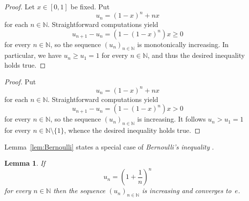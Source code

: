\documentclass[12pt]{article}
\newcommand{\bN}{\mathbb{N}} %
\newtheorem{lemma}{Lemma}
\begin{document}
\begin{proof}
  Let $x \in [0, 1]$ be fixed.
  Put
  $$
  u _n =  \left( 1 - x \right)^n + n x  
  $$
  for each $n \in \bN$.
  Straightforward computations yield
  $$
  u_{n + 1} - u_n = \left(1 - {(1 - x)}^n \right) x \ge 0
  $$
  for every $n \in \bN$,
  so the sequence $\left( u_n \right)_{n \in \bN}$ is monotonically increasing.
  In particular, we have $u_n \ge u_1 = 1$ for every $n \in \bN$,
  and thus the desired inequality holds true.  
\end{proof}


\begin{proof}
  Put
  $$
  u _n =  \left( 1 - x \right)^n + n x  
  $$
  for each $n \in \bN$.
  Straightforward computations yield
  $$
  u_{n + 1} - u_n = \left(1 - {(1 - x)}^n \right) x > 0
  $$
  for every $n \in \bN$, so the sequence $\left( u_n \right)_{n \in \bN}$ is increasing.
  It follows $u_n > u_1 = 1$ for every $n \in \bN \setminus \{ 1 \}$,
  whence the desired  inequality holds true.  
\end{proof} 


Lemma~\ref{lem:Bernoulli} states a special case of \emph{Bernoulli's inequality} \cite{MitrinovicAI}.

\begin{lemma} \label{lem:convergence-to-e}
  If
  $$
  u_n = \left( 1 + \frac{1}{n} \right)^n
  $$
  for every $n \in \bN$ then the sequence $\left( u_n  \right)_{n \in \bN}$ is increasing and converges to~$e$.
\end{lemma}
\end{document}
